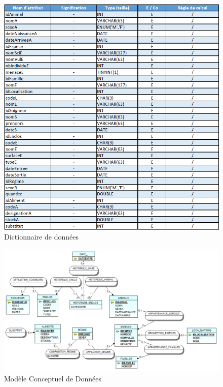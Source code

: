 \documentclass[12pt,a4paper,titlepage]{report}
\newenvironment{changemargin}[2]{\begin{list}{}{%
\setlength{\topsep}{0pt}%
\setlength{\leftmargin}{0pt}%
\setlength{\rightmargin}{0pt}%
\setlength{\listparindent}{\parindent}%
\setlength{\itemindent}{\parindent}%
\setlength{\parsep}{0pt plus 1pt}%
\addtolength{\leftmargin}{#1}%
\addtolength{\rightmargin}{#2}%
}\item }{\end{list}}
\begin{document}
\begin{figure}[h!]
	\begin{changemargin}{-3.5cm}{-4cm}
	\centering
   \includegraphics[scale=0.85]{dictionnaire.png}
   \caption{\label{étiquette} Dictionnaire de données}
   \end{changemargin}
\end{figure}


\begin{figure}[h!]
	\begin{changemargin}{-3.5cm}{-4cm}
	\centering
   \includegraphics[angle=-90, scale=0.85]{MCD17_version3.png}
   \caption{\label{étiquette} Modèle Conceptuel de Données}
   \end{changemargin}
\end{figure}	
\end{document}
